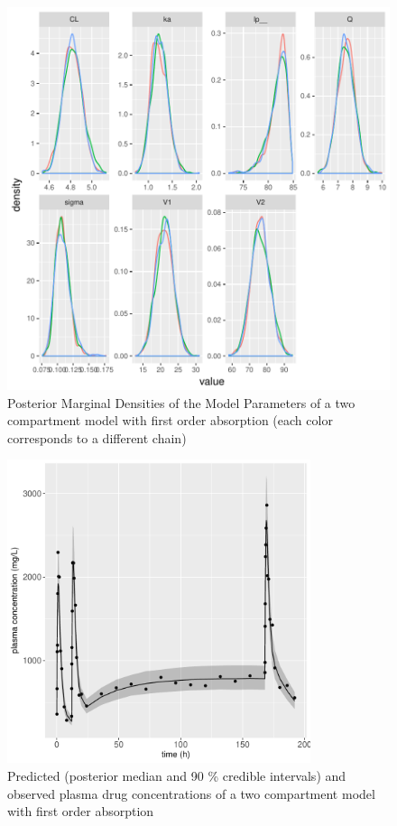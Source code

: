\documentclass[11pt]{amsart}
\begin{document}
\begin{figure}[!htb]
\begin{center}
\includegraphics[width=4.5in,trim=0in 0in 0 0in]{graphics/TwoCptModelPlots003.pdf}
\caption{{Posterior Marginal Densities of the Model Parameters of a two compartment model with first order absorption (each color corresponds to a different chain)}}
\label{TwoCptDensity}
\end{center}
\end{figure}

\begin{figure}[!htb]
\begin{center}
\includegraphics[width=3.5in,trim=0in 0in 0 0in]{graphics/TwoCptModelPlots006.pdf}
\caption{{Predicted (posterior median and 90 \% credible intervals) and observed plasma drug concentrations of a two compartment model with first order absorption}}
\label{TwoCptPredictions}
\end{center}
\end{figure}
\end{document}

